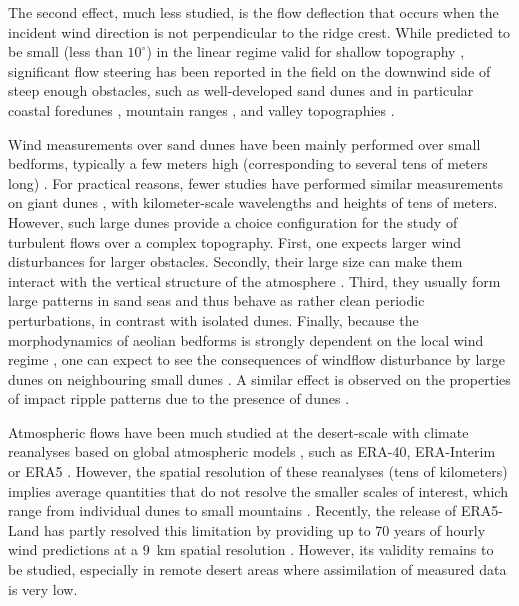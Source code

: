 The second effect, much less studied, is the flow deflection that occurs when the incident wind direction is not perpendicular to the ridge crest. While predicted to be small (less than $10^{\circ}$) in the linear regime valid for shallow topography \citep{Gadal2019}, significant flow steering has been reported in the field on the downwind side of steep enough obstacles, such as well-developed sand dunes \citep{Tsoar1983, Sweet1990, Walker2002, Smith2017} and in particular coastal foredunes \citep[e.g.][]{Hunter1983, rasmussen1989, Walker2006, Walker2009, Hesp2015, Walker2017, deWinter2020}, mountain ranges \citep{Kim2000, Lewis2008, Fernando2019}, and valley topographies \citep{Wiggs2002, Garvey2005}.

Wind measurements over sand dunes have been mainly performed over small bedforms, typically a few meters high (corresponding to several tens of meters long) \citep[e.g.][]{Mulligan1988, Hesp1989, Lancaster1996, MckennaNeuman1997, Sauermann2003, Andreotti2002, Walker2002, Weaver2011}. For practical reasons, fewer studies have performed similar measurements on giant dunes \citep{Havholm1988}, with kilometer-scale wavelengths and heights of tens of meters. However, such large dunes provide a choice configuration for the study of turbulent flows over a complex topography. First, one expects larger wind disturbances for larger obstacles. Secondly, their large size can make them interact with the vertical structure of the atmosphere \citep{Andreotti2009}. Third, they usually form large patterns in sand seas and thus behave as rather clean periodic perturbations, in contrast with isolated dunes. Finally, because the morphodynamics of aeolian bedforms is strongly dependent on the local wind regime \citep{Livingstone2019}, one can expect to see the consequences of windflow disturbance by large dunes on neighbouring small dunes \citep{Brookfield1977, Ewing2006}. A similar effect is observed on the properties of impact ripple patterns due to the presence of dunes \citep{Howard1977, Hood2021}.

Atmospheric flows have been much studied at the desert-scale with climate reanalyses based on global atmospheric models \citep{Blumberg1996, Livingstone2010, Ashkenazy2012, Jolivet2021, Hu2021, gunn2021}, such as ERA-40, ERA-Interim or ERA5 \citep{Uppala2005, Dee2011, Hersbach2020}. However, the spatial resolution of these reanalyses (tens of kilometers) implies average quantities that do not resolve the smaller scales of interest, which range from individual dunes to small mountains \citep{Livingstone2010}. Recently, the release of ERA5-Land has partly resolved this limitation by providing up to 70 years of hourly wind predictions at a $9$~km spatial resolution \citep{munoz2021}. However, its validity remains to be studied, especially in remote desert areas where assimilation of measured data is very low.

